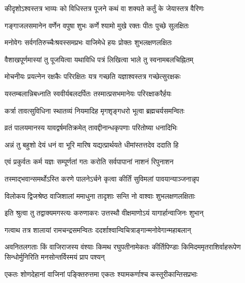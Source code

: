 

\twolineshloka
{कीदृशोऽश्वस्तत्र भाव्यः को विधिस्तत्र पूजने}
{कथं वा शक्यते कर्तुं के जेयास्तत्र वैरिणः}%


\twolineshloka
{गङ्गाजलसमानेन वर्णेन वपुषा शुभः}
{कर्णे श्यामो मुखे रक्तः पीतः पुच्छे सुलक्षितः}%

\twolineshloka
{मनोवेगः सर्वगतिरुच्चैःश्रवस्समप्रभः}
{वाजिमेधे हयः प्रोक्तः शुभलक्षणलक्षितः}%

\twolineshloka
{वैशाखपूर्णमास्यां तु पूजयित्वा यथाविधि}
{पत्रं लिखित्वा भाले तु स्वनामबलचिह्नितम्}%

\twolineshloka
{मोचनीयः प्रयत्नेन रक्षकैः परिरक्षितः}
{यत्र गच्छति यज्ञाश्वस्तत्र गच्छेत्सुरक्षकः}%

\twolineshloka
{यस्तम्बलान्निबध्नाति स्ववीर्यबलदर्पितः}
{तस्मात्प्रसभमानेयः परिरक्षाकरैर्हयः}%

\twolineshloka
{कर्त्रा तावत्सुविधिना स्थातव्यं नियमादिह}
{मृगशृङ्गधरो भूत्वा ब्रह्मचर्यसमन्वितः}%

\twolineshloka
{व्रतं पालयमानस्य यावद्वर्षमतिक्रमेत्}
{तावद्दीनान्धकृपणाः परितोष्या धनादिभिः}%

\twolineshloka
{अन्नं तु बहुशो देयं धनं वा भूरि मारिष}
{यद्यत्प्रार्थयते धीमांस्तत्तदेव ददाति हि}%

\twolineshloka
{एवं प्रकुर्वतः कर्म यज्ञः सम्पूर्णतां गतः}
{करोति सर्वपापानां नाशनं रिपुनाशन}%

\twolineshloka
{तस्माद्भवान्समर्थोऽस्ति करणे पालनेऽर्चने}
{कृत्वा कीर्तिं सुविमलां पावयान्याञ्जनान्नृप}%


\twolineshloka
{विलोकय द्विजश्रेष्ठ वाजिशालां ममाधुना}
{तादृशाः सन्ति नो वाश्वाः शुभलक्षणलक्षिताः}%

\twolineshloka
{इति श्रुत्वा तु तद्वाक्यमगस्त्यः करुणाकरः}
{उत्तस्थौ वीक्षमाणोऽयं यागार्हान्वाजिनः शुभान्}%

\twolineshloka
{गत्वाथ तत्र शालायां रामचन्द्रसमन्वितः}
{ददर्शाश्वान्विचित्राङ्गान्मनोवेगान्महाबलान्}%

\twolineshloka
{अवनितलगताः किं वाजिराजस्य वंश्याः किमथ रघुपतीनामेकतः कीर्तिपिण्डाः}
{किमिदममृतराशिर्वाहरूपेण सिन्धोर्मुनिरिति मनसोन्तर्विस्मयं प्राप पश्यन्}%

\twolineshloka
{एकतः शोणदेहानां वाजिनां पङ्क्तिरुत्तमा}
{एकतः श्यामकर्णाश्च कस्तूरीकान्तिसप्रभाः}%

